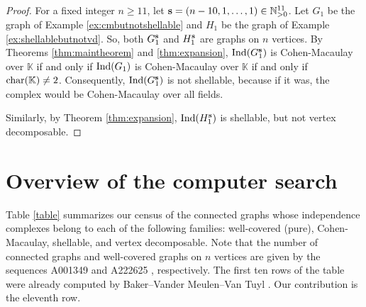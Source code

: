 \documentclass[10pt,a4paper]{amsart}
\theoremstyle{plain}
\theoremstyle{definition}
\theoremstyle{remark}
\numberwithin{equation}{section}
\numberwithin{equation}{section}
\begin{document}
\begin{proof}
    For a fixed integer $n \geq 11$, let ${\bf s} = (n-10,1,\dots,1) \in \mathbb{N}^{11}_{>0}$.  Let $G_1$ be the graph of Example \ref{ex:cmbutnotshellable} and
    $H_1$ be the graph of Example \ref{ex:shellablebutnotvd}.  So,
    both $G_1^{\bf s}$ and $H_1^{\bf s}$ are graphs on $n$ vertices.
    By Theorems \ref{thm:maintheorem} and \ref{thm:expansion}, 
    ${\rm Ind}(G_1^{\bf s})$ is Cohen-Macaulay over $\mathbb{K}$ if and only if
    ${\rm Ind}(G_1)$ is Cohen-Macaulay over $\mathbb{K}$ if and only if 
    ${\rm char}(\mathbb{K}) \neq 2$.  Consequently, 
    ${\rm Ind}(G_1^{\bf s})$ is not shellable, because if it was, 
    the complex would be Cohen-Macaulay over all fields.   

    Similarly, by Theorem \ref{thm:expansion}, ${\rm Ind}(H_1^{\bf s})$ is
    shellable, but not vertex decomposable.
\end{proof}


\section{Overview of the computer search}\label{sec:computations} 

Table \ref{table} summarizes our census of the connected graphs
whose independence complexes belong to each of the following families: 
well-covered (pure), Cohen-Macaulay, shellable, and vertex decomposable.
Note that the number of connected graphs
and well-covered graphs on $n$ vertices are given by the sequences
A001349 \cite{oeisA001349} and A222625
\cite{oeisA222625}, respectively.  The first ten rows of the table 
were already computed by Baker--Vander Meulen--Van Tuyl
\cite{BVMVT2018}.  Our contribution is the eleventh row.
\end{document}
